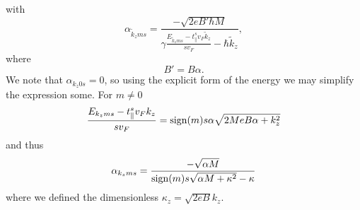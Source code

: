 with
\begin{equation}
  \alpha_{\tilde{k}_z m s} = \frac{-\sqrt{2e B' \hbar M}}{ \gamma \frac{E_{\tilde{k}_z m s} - t^s_{\parallel} v_{F} \tilde{k}_{z}}{s v_{F}} - \hbar  \tilde{k}_z},
\end{equation}
where
\[
B' = B \alpha.
\]
We note that \( \alpha_{k_z 0 s} = 0 \), so using the explicit form of the energy we may simplify the expression some.
For \( m\neq 0 \)
\[
  \frac{
    E_{k_z m s} - t^s_{\parallel} v_F k_z
  }{s v_{F}} = \operatorname{sign}(m) s \alpha \sqrt{2 M e B \alpha + k_{z}^2}
\]
and thus
\begin{equation}
  \label{eq:48}
  \alpha_{k_z m s} =
  \frac{-\sqrt{ \alpha M }}{\operatorname{sign}(m) s \sqrt{\alpha M + \kappa^2} - \kappa}
\end{equation}
where we defined the dimensionless \( \kappa_z = \sqrt{2 e B} k_z  \).

